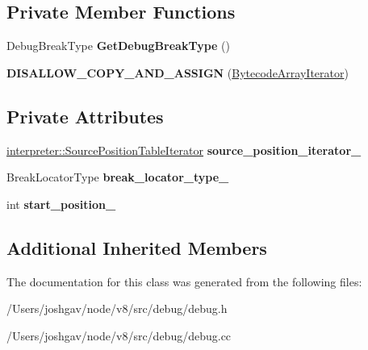 \subsection*{Private Member Functions}
\begin{DoxyCompactItemize}
\item 
Debug\+Break\+Type {\bfseries Get\+Debug\+Break\+Type} ()\hypertarget{classv8_1_1internal_1_1_break_location_1_1_bytecode_array_iterator_a8bdce7735b057a7a72bc9fa935a69bed}{}\label{classv8_1_1internal_1_1_break_location_1_1_bytecode_array_iterator_a8bdce7735b057a7a72bc9fa935a69bed}

\item 
{\bfseries D\+I\+S\+A\+L\+L\+O\+W\+\_\+\+C\+O\+P\+Y\+\_\+\+A\+N\+D\+\_\+\+A\+S\+S\+I\+GN} (\hyperlink{classv8_1_1internal_1_1_break_location_1_1_bytecode_array_iterator}{Bytecode\+Array\+Iterator})\hypertarget{classv8_1_1internal_1_1_break_location_1_1_bytecode_array_iterator_ad169bbfb0db2b05490b862aa58b08ab7}{}\label{classv8_1_1internal_1_1_break_location_1_1_bytecode_array_iterator_ad169bbfb0db2b05490b862aa58b08ab7}

\end{DoxyCompactItemize}
\subsection*{Private Attributes}
\begin{DoxyCompactItemize}
\item 
\hyperlink{classv8_1_1internal_1_1interpreter_1_1_source_position_table_iterator}{interpreter\+::\+Source\+Position\+Table\+Iterator} {\bfseries source\+\_\+position\+\_\+iterator\+\_\+}\hypertarget{classv8_1_1internal_1_1_break_location_1_1_bytecode_array_iterator_a9ba60f131ab89852660fdd0e45ff2988}{}\label{classv8_1_1internal_1_1_break_location_1_1_bytecode_array_iterator_a9ba60f131ab89852660fdd0e45ff2988}

\item 
Break\+Locator\+Type {\bfseries break\+\_\+locator\+\_\+type\+\_\+}\hypertarget{classv8_1_1internal_1_1_break_location_1_1_bytecode_array_iterator_afdd201e7088c2395036d04fc4d14d84a}{}\label{classv8_1_1internal_1_1_break_location_1_1_bytecode_array_iterator_afdd201e7088c2395036d04fc4d14d84a}

\item 
int {\bfseries start\+\_\+position\+\_\+}\hypertarget{classv8_1_1internal_1_1_break_location_1_1_bytecode_array_iterator_a6e1d2f4cb308d134100ddd489dad2531}{}\label{classv8_1_1internal_1_1_break_location_1_1_bytecode_array_iterator_a6e1d2f4cb308d134100ddd489dad2531}

\end{DoxyCompactItemize}
\subsection*{Additional Inherited Members}


The documentation for this class was generated from the following files\+:\begin{DoxyCompactItemize}
\item 
/\+Users/joshgav/node/v8/src/debug/debug.\+h\item 
/\+Users/joshgav/node/v8/src/debug/debug.\+cc\end{DoxyCompactItemize}
